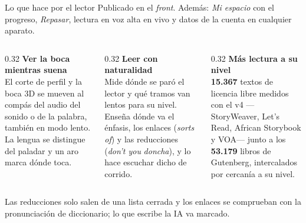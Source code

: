 \documentclass[aspectratio=169,11pt]{beamer}
\begin{document}
\begin{frame}{Lo que hace por el lector}
\vspace{1mm}
{\small Publicado en el \emph{front}. Además: \emph{Mi espacio} con el progreso,
\emph{Repasar}, lectura en voz alta en vivo y datos de la cuenta en cualquier aparato.}
\vspace{3mm}

\begin{columns}[T]
\begin{column}{0.32\textwidth}
\textbf{\color{llazul} Ver la boca mientras suena}\\[2pt]
{\small El corte de perfil y la boca 3D se mueven al compás del audio del sonido
o de la palabra, también en modo lento. La lengua se distingue del paladar y un
aro marca dónde toca.}
\end{column}
\begin{column}{0.32\textwidth}
\textbf{\color{llazul} Leer con naturalidad}\\[2pt]
{\small Mide dónde se paró el lector y qué tramos van lentos para su nivel.
Enseña dónde va el énfasis, los enlaces (\emph{sorts of}) y las reducciones
(\emph{don't you} \textrightarrow{} \emph{doncha}), y lo hace escuchar dicho de
corrido.}
\end{column}
\begin{column}{0.32\textwidth}
\textbf{\color{llazul} Más lectura a su nivel}\\[2pt]
{\small \textbf{15.367} textos de licencia libre medidos con el v4
---StoryWeaver, Let's Read, African Storybook y VOA--- junto a los
\textbf{53.179} libros de Gutenberg, intercalados por cercanía a su nivel.}
\end{column}
\end{columns}

\vspace{4mm}
{\footnotesize\color{llgris} Las reducciones solo salen de una lista cerrada y
los enlaces se comprueban con la pronunciación de diccionario; lo que escribe la IA
va marcado.}
\end{frame}
\end{document}
